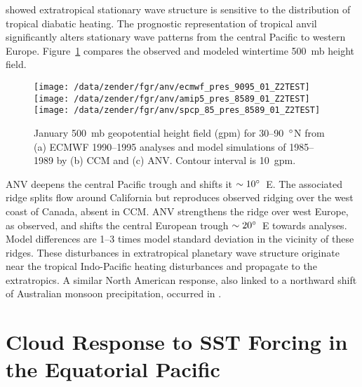 \documentclass[twoside,agupp]{aguplus}
\begin{document}
\cite{HoK81} showed extratropical stationary wave structure is 
sensitive to the distribution of tropical diabatic heating.
The prognostic representation of tropical anvil significantly alters
stationary wave patterns from the central Pacific to western Europe.
Figure~\ref{fig:pres_8589_Z2TEST} compares the observed and modeled
wintertime 500~mb height field.
\begin{figure*}
\begin{center}
\texttt{[image: /data/zender/fgr/anv/ecmwf\_pres\_9095\_01\_Z2TEST]}%
\texttt{[image: /data/zender/fgr/anv/amip5\_pres\_8589\_01\_Z2TEST]}%
\texttt{[image: /data/zender/fgr/anv/spcp\_85\_pres\_8589\_01\_Z2TEST]}%
\end{center}
\caption[January 500~mb geopotential height field for
30--90~$\dgr$N from ECMWF 1990--1995 analyses and model 
simulations of 1985--1989 by CCM and ANV]{
January 500~mb geopotential height field (gpm) for
30--90~$\dgr$N from (a) ECMWF 1990--1995 analyses and model 
simulations of 1985--1989 by (b) CCM and (c) ANV.
Contour interval is 10~gpm. 
\label{fig:pres_8589_Z2TEST}}   
\end{figure*}
ANV deepens the central Pacific trough and shifts it $\sim 10 
^{\circ}$~E.
The associated ridge splits flow around California but reproduces 
observed ridging over the west coast of Canada, absent in CCM.
ANV strengthens the ridge over west Europe, as observed, and shifts
the central European trough $\sim 20 ^{\circ}$~E towards analyses. 
Model differences are 1--3 times model standard deviation in the
vicinity of these ridges. 
These disturbances in extratropical planetary wave structure originate
near the tropical Indo-Pacific heating disturbances and propagate to
the extratropics. 
A similar North American response, also linked to a northward shift of
Australian monsoon precipitation, occurred in \cite{Kie942}.

\section{Cloud Response to SST Forcing in the Equatorial
Pacific}\label{sec:enso}   
\end{document}
